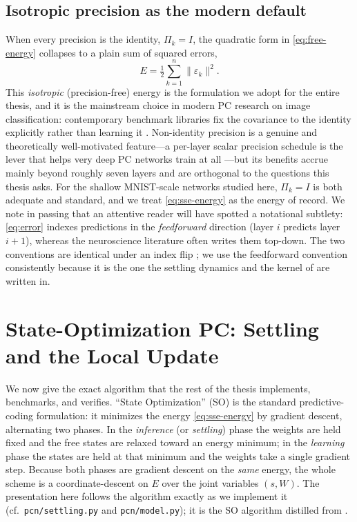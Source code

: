 \subsection{Isotropic precision as the modern default}

When every precision is the identity, $\Pi_k = I$, the quadratic form in \cref{eq:free-energy}
collapses to a plain sum of squared errors,
\begin{equation}
  E = \tfrac{1}{2}\sum_{k=1}^{n} \lVert \varepsilon_k \rVert^2 .
  \label{eq:sse-energy}
\end{equation}
This \emph{isotropic} (precision-free) energy is the formulation we adopt for the entire thesis,
and it is the mainstream choice in modern PC research on image classification: contemporary
benchmark libraries fix the covariance to the identity explicitly rather than learning it
\citep{pinchetti2024pcx,millidge2024jpc}. Non-identity precision is a genuine and theoretically
well-motivated feature---a per-layer scalar precision schedule is the lever that helps very deep
PC networks train at all \citep{qi2025settling}---but its benefits accrue mainly beyond roughly
seven layers and are orthogonal to the questions this thesis asks. For the shallow MNIST-scale
networks studied here, $\Pi_k = I$ is both adequate and standard, and we treat
\cref{eq:sse-energy} as the energy of record. We note in passing that an attentive reader will
have spotted a notational subtlety: \cref{eq:error} indexes predictions in the
\emph{feedforward} direction (layer $i$ predicts layer $i+1$), whereas the neuroscience literature
often writes them top-down. The two conventions are identical under an index flip
\citep{millidge2021review}; we use the feedforward convention consistently because it is the one
the settling dynamics and the kernel of  are written in.

\section{State-Optimization PC: Settling and the Local Update}\label{sec:so-pc}

We now give the exact algorithm that the rest of the thesis implements, benchmarks, and verifies.
``State Optimization'' (SO) is the standard predictive-coding formulation: it minimizes the energy
\cref{eq:sse-energy} by gradient descent, alternating two phases. In the \emph{inference} (or
\emph{settling}) phase the weights are held fixed and the free states are relaxed toward an energy
minimum; in the \emph{learning} phase the states are held at that minimum and the weights take a
single gradient step. Because both phases are gradient descent on the \emph{same} energy, the
whole scheme is a coordinate-descent on $E$ over the joint variables $(s,W)$. The presentation
here follows the algorithm exactly as we implement it (cf.\ \texttt{pcn/settling.py} and
\texttt{pcn/model.py}); it is the SO algorithm distilled from \citet{goemaere2025epc}.

